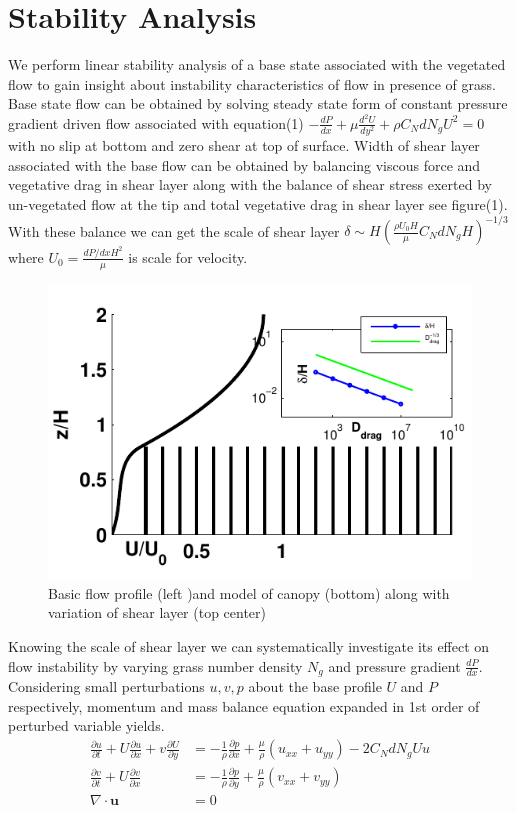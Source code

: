 \documentclass[aps,twocolumn,floatfix,prl,10pt]{revtex4-1}
\newcommand{\bu}{\mathbf{u}}
\newcommand{\del}{\partial}
\begin{document}
\section{Stability Analysis}
We perform linear stability analysis of a base state associated with the vegetated flow to gain insight about instability characteristics of flow in presence of grass.
Base state flow can be obtained by solving steady state form of constant pressure gradient driven flow associated with equation(1)
$-\frac{dP}{dx}+\mu\frac{d^2U}{dy^2}+\rho C_N d N_gU^2=0$ with no slip at bottom and zero shear at top of surface. Width of shear layer associated with the base flow can be 
obtained by balancing viscous force and vegetative drag in shear layer along with the balance of shear stress exerted by un-vegetated flow at the tip and total vegetative 
drag in shear layer see figure(1). With these balance we can get the scale of shear layer $\delta \sim H\left(\frac{\rho U_0 H}{\mu} C_N d N_g H\right)^{-1/3}$
where $U_0 = \frac{dP/dxH^2}{\mu}$ is scale for velocity.
\begin{figure}[htb!]
  \includegraphics[]{fig1}
\caption{Basic flow profile (left )and model of canopy (bottom) along with variation of shear layer (top center) }
\end{figure}
Knowing the scale of shear layer we can systematically investigate its effect on flow instability
by varying grass number density $N_g$ and pressure gradient $\frac{dP}{dx}$. Considering small perturbations $u, v, p$ about the base profile $U$ and $P$
respectively, momentum and mass balance equation expanded in 1st order of perturbed variable yields.
\begin{equation}
\begin{split}
 \frac{\del u}{\del t}+U\frac{\del u}{\del x}+v\frac{\del U}{\del y} &= -\frac{1}{\rho}\frac{\del p}{\del x}+\frac{\mu}{\rho}(u_{xx}+u_{yy})-2C_{N}dN_{g}Uu\\
 \frac{\del v}{\del  t}+ U\frac{\del v}{\del x} &= -\frac{1}{\rho}\frac{\del p}{\del y}+\frac{\mu}{\rho}(v_{xx}+v_{yy})\\
 \nabla\cdot \bu &= 0
\end{split}
\end{equation}
\end{document}
